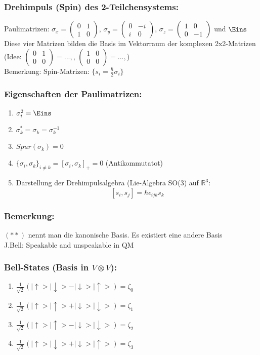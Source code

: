 \documentclass[twoside,a4paper]{scrartcl}
\newcommand{\R}{\mathbb{R}}
\renewcommand{\1}{\mathds{1}}
\renewcommand{\R}{\mathbb{R}}
\begin{document}
\subsubsection*{Drehimpuls (Spin) des 2-Teilchensystems:}
Paulimatrizen: $\sigma_x=\begin{pmatrix}0 & 1 \\ 1 & 0 \end{pmatrix}$, $\sigma_y=\begin{pmatrix}0 & -i \\ i& 0 \end{pmatrix}$, $\sigma_z=\begin{pmatrix}1 & 0 \\ 0 & -1 \end{pmatrix}$ und $\Eins$\\
Diese vier Matrizen bilden die Basis im Vektorraum der komplexen 2x2-Matrizen (Idee: $\begin{pmatrix}0 & 1 \\ 0 & 0 \end{pmatrix}=...,$, $\begin{pmatrix}1 & 0 \\ 0 & 0 \end{pmatrix}=...,$)\\
Bemerkung: Spin-Matrizen: $\{ s_i=\frac{\hbar}{2}\sigma_i \}$
\subsubsection*{Eigenschaften der Paulimatrizen:}
\begin{enumerate}
\item $\sigma_i^2=\Eins$
\item $\sigma_k^*=\sigma_k=\sigma_k^{-1}$
\item $Spur(\sigma_k)=0$
\item $\{\sigma_i, \sigma_k\}_{i\neq k}=[\sigma_i, \sigma_k]_+=0$ (Antikommutatot)
\item Darstellung der Drehimpulsalgebra (Lie-Algebra SO(3) auf $\R^3$:
$$[s_i,s_j]=\hbar \epsilon_{ijk} s_k$$
\end{enumerate}
\subsubsection*{Bemerkung:}
$(**)$ nennt man die kanonische Basis. Es existiert eine andere Basis\\
J.Bell: Speakable and unspeakable in QM
\subsubsection*{Bell-States (Basis in $V\otimes V$):}
\begin{enumerate}
\item $\frac{1}{\sqrt{2}}(|\uparrow>|\downarrow>-|\downarrow>|\uparrow>)=\zeta_0$
\item $\frac{1}{\sqrt{2}}(|\uparrow>|\uparrow>+|\downarrow>|\downarrow>)=\zeta_1$
\item $\frac{1}{\sqrt{2}}(|\uparrow>|\uparrow>-|\downarrow>|\downarrow>)=\zeta_2$
\item $\frac{1}{\sqrt{2}}(|\uparrow>|\downarrow>+|\downarrow>|\uparrow>)=\zeta_3$
\end{enumerate}
\end{document}
